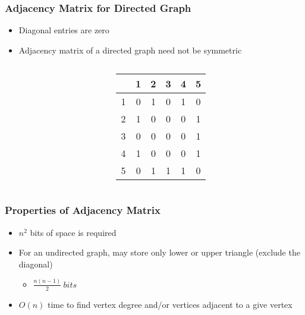 \documentclass[newPxFont,sthlmFooter,nooffset]{beamer}
\begin{document}
\begin{frame}[t]
  \frametitle{Adjacency Matrix for Directed Graph}
  \begin{itemize}
  \item Diagonal entries are zero
  \item Adjacency matrix of a directed graph need not be symmetric
  \end{itemize}
    \begin{columns}
      \begin{column}{0.4\textwidth}
      \end{column}
      \begin{column}{0.4\textwidth}
\begin{tabular}{c | c c c c c }
  ~ & 1 & 2 & 3 & 4 & 5 \\ \hline
  1 & \cellcolor{blue!25}0 & 1 & 0 & 1 & 0 \\ 
  2 & 1 & \cellcolor{blue!25}0 & 0 & 0 & 1 \\
  3 & 0 & 0 & \cellcolor{blue!25}0 & 0 & 1 \\
  4 & 1 & 0 & 0 & \cellcolor{blue!25}0 & 1 \\
  5 & 0 & 1 & 1 & 1 & \cellcolor{blue!25}0 
\end{tabular}        
      \end{column}
    \end{columns}
\end{frame}


\begin{frame}[t]
  \frametitle{Properties of Adjacency Matrix}
  \begin{itemize}
  \item $n^2$ bits of space is required
  \item For an undirected graph, may store only lower or upper triangle (exclude the diagonal)
    \begin{itemize}
    \item $\frac{n(n-1)}{2}~bits$
    \end{itemize}
  \item $O(n)$ time to find vertex degree and/or vertices adjacent to a give vertex
  \end{itemize}
\end{frame}
\end{document}
